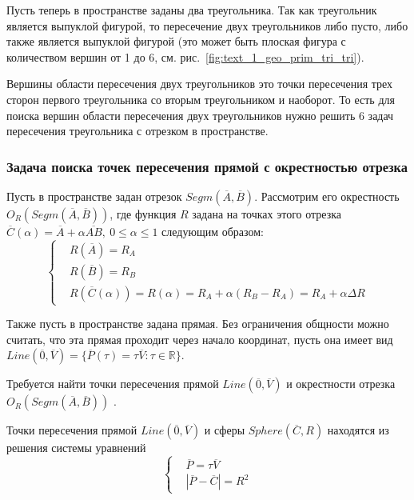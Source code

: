 Пусть теперь в пространстве заданы два треугольника.
Так как треугольник является выпуклой фигурой, то пересечение двух треугольников либо пусто, либо также является выпуклой фигурой (это может быть плоская фигура с количеством вершин от 1 до 6, см. рис.~\ref{fig:text_1_geo_prim_tri_tri}).

Вершины области пересечения двух треугольников это точки пересечения трех сторон первого треугольника со вторым треугольником и наоборот.
То есть для поиска вершин области пересечения двух треугольников нужно решить 6 задач пересечения треугольника с отрезком в пространстве.

\subsubsection{Задача поиска точек пересечения прямой с окрестностью отрезка}\label{sec:text_1_geo_prim_line_eps_intersect}

Пусть в пространстве задан отрезок $Segm(\overline{A}, \overline{B})$.
Рассмотрим его окрестность $O_R(Segm(\overline{A}, \overline{B}))$, где функция $R$ задана на точках этого отрезка $\overline{C}(\alpha) = \overline{A} + \alpha \overline{AB}, \ 0 \le \alpha \le 1$ следующим образом:
\begin{equation}
	\left\{
		\begin{aligned}
			& R(\overline{A}) = R_A \\
			& R(\overline{B}) = R_B \\
			& R(\overline{C}(\alpha)) = R(\alpha) = R_A + \alpha (R_B - R_A) = R_A + \alpha \Delta R
		\end{aligned}
	\right.
\end{equation}

Также пусть в пространстве задана прямая.
Без ограничения общности можно считать, что эта прямая проходит через начало координат, пусть она имеет вид $Line(\overline{0}, \overline{V}) = \{ \overline{P}(\tau) = \tau \overline{V}: \tau \in \mathbb{R} \}$.

Требуется найти точки пересечения прямой $Line(\overline{0}, \overline{V})$ и окрестности отрезка $O_R(Segm(\overline{A}, \overline{B}))$ \cite{Rybakov2017Flight}.

Точки пересечения прямой $Line(\overline{0}, \overline{V})$ и сферы $Sphere(\overline{C}, R)$ находятся из решения системы уравнений
\begin{equation}\label{eqn:text_1_geo_prim_tv_pcr}
	\left\{
		\begin{aligned}
			& \overline{P} = \tau \overline{V} \\
			& |\overline{P} - \overline{C}| = R^2
		\end{aligned}
	\right.
\end{equation}

